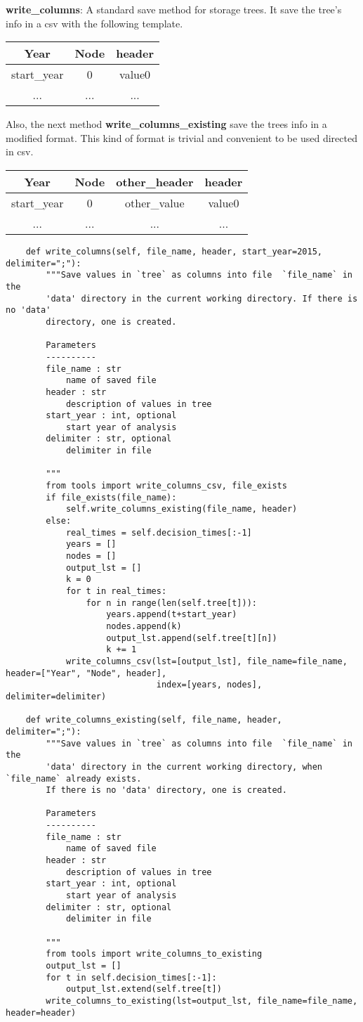 \documentclass[12pt]{article}
\begin{document}
\textbf{write\_columns}: A standard save method for storage trees. It save the tree's info in a csv with the following template.
\begin{center}
\begin{tabular}{ |c|c|c| }
 \hline
 Year  &  Node  & header  \\
 \hline
 start_year & 0 & value0 \\
 \hline
 ... & ... & ... \\
 \hline
\end{tabular}
\end{center}
Also, the next method \textbf{write\_columns\_existing} save the trees info in a modified format.
This kind of format is trivial and convenient to be used directed in csv.
\begin{center}
\begin{tabular}{ |c|c|c|c| }
 \hline
 Year  &  Node  & other\_header & header  \\
 \hline
 start_year & 0 & other\_value & value0 \\
 \hline
 ... & ... & ... & ... \\
 \hline
\end{tabular}
\end{center}
\begin{verbatim}
	def write_columns(self, file_name, header, start_year=2015, delimiter=";"):
		"""Save values in `tree` as columns into file  `file_name` in the
		'data' directory in the current working directory. If there is no 'data'
		directory, one is created.
		
		Parameters
		----------
		file_name : str
			name of saved file
		header : str
			description of values in tree
		start_year : int, optional
			start year of analysis
		delimiter : str, optional
			delimiter in file

		"""
		from tools import write_columns_csv, file_exists
		if file_exists(file_name):
			self.write_columns_existing(file_name, header)
		else:
			real_times = self.decision_times[:-1]
			years = []
			nodes = []
			output_lst = []
			k = 0
			for t in real_times:
				for n in range(len(self.tree[t])):
					years.append(t+start_year)
					nodes.append(k)
					output_lst.append(self.tree[t][n])
					k += 1
			write_columns_csv(lst=[output_lst], file_name=file_name, header=["Year", "Node", header],
							  index=[years, nodes], delimiter=delimiter)

	def write_columns_existing(self, file_name, header, delimiter=";"):
		"""Save values in `tree` as columns into file  `file_name` in the
		'data' directory in the current working directory, when `file_name` already exists.
		If there is no 'data' directory, one is created.

		Parameters
		----------
		file_name : str
			name of saved file
		header : str
			description of values in tree
		start_year : int, optional
			start year of analysis
		delimiter : str, optional
			delimiter in file

		"""
		from tools import write_columns_to_existing
		output_lst = []
		for t in self.decision_times[:-1]:
			output_lst.extend(self.tree[t])
		write_columns_to_existing(lst=output_lst, file_name=file_name, header=header)
\end{verbatim}
\end{document}
